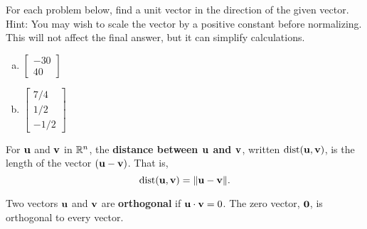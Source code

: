 \begin{exercise} %
	For each problem below, find a unit vector in the direction of the given vector. \\
	Hint: You may wish to scale the vector by a positive constant before normalizing. This will not affect the final answer, but it can simplify calculations.
	\begin{multicols}{2}
		\begin{enumerate}[(a)]
			\item $\begin{bmatrix}-30\\40\end{bmatrix}$
			\columnbreak
			\item $\begin{bmatrix}7/4\\1/2\\-1/2\end{bmatrix}$
		\end{enumerate}
	\end{multicols}
\end{exercise}
\vfill


\newpage


\begin{boxdef}
	For $\boldsymbol{\mathbf{u}}$ and $\boldsymbol{\mathbf{v}}$ in $\mathbb{R}^n$, the \textbf{distance between $\boldsymbol{\boldsymbol{\mathbf{u}}}$ and $\boldsymbol{\boldsymbol{\mathbf{v}}}$}, written $\operatorname{dist}(\boldsymbol{\mathbf{u}},\boldsymbol{\mathbf{v}})$, is the length of the vector $(\boldsymbol{\mathbf{u}}-\boldsymbol{\mathbf{v}})$. That is,
	\vspace{-1ex}
	$$ \operatorname{dist}(\boldsymbol{\mathbf{u}},\boldsymbol{\mathbf{v}}) = \| \boldsymbol{\mathbf{u}}-\boldsymbol{\mathbf{v}} \|. $$
\end{boxdef}
\vspace{-1em}
\begin{boxdef}
	Two vectors $\boldsymbol{\mathbf{u}}$ and $\boldsymbol{\mathbf{v}}$ are \textbf{orthogonal} if $\boldsymbol{\mathbf{u}}\cdot\boldsymbol{\mathbf{v}}=0$. The zero vector, $\boldsymbol{\mathbf{0}}$, is orthogonal to every vector.
\end{boxdef}


